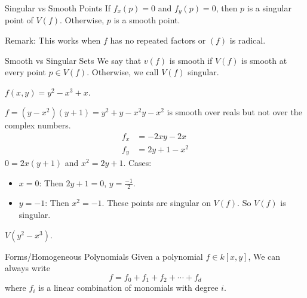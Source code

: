 \documentclass{report}
\begin{document}
\begin{definition}{Singular vs Smooth Points}
    If $f_{x}(p) = 0$ and $f_{y}(p) = 0$, then $p$ is a singular point of $V(f)$. Otherwise, $p$ is a smooth point.
\end{definition}

Remark: This works when $f$ has no repeated factors or $(f)$ is radical.

\begin{definition}{Smooth vs Singular Sets}
    We say that $v(f)$ is smooth if $V(f)$ is smooth at every point $p \in V(f)$. Otherwise, we call $V(f)$ singular.
\end{definition}

\begin{examples}
    \begin{example}
        $f(x, y) = y^{2} - x^{3} + x$.
    \end{example}
    \begin{example}
        $f = (y - x^{2})(y + 1) = y^{2} + y - x^{2}y - x^{2}$ is smooth over reals but not over the complex numbers. 
            \begin{align*}
                f_{x} &= -2xy - 2x      \\
                f_{y} &= 2y + 1 - x^{2}   
            \end{align*}
        $0 = 2x(y + 1)$ and $x^{2} = 2y + 1$. Cases:
            \begin{itemize}
                \item $x = 0$: Then $2y + 1 = 0$, $y = \frac{-1}{2}$.

                \item $y = -1$: Then $x^{2} = -1$. These points are singular on $V(f)$. So $V(f)$ is singular.
            \end{itemize}
    \end{example}
    \begin{example}
        $V(y^{2} - x^{3})$.
    \end{example}
\end{examples}

\begin{definition}{Forms/Homogeneous Polynomials}
    Given a polynomial $f \in k[x, y]$, We can always write
        \begin{equation*}
            f = f_{0} + f_{1} + f_{2} + \cdots + f_{d}
        \end{equation*}
    where $f_{i}$ is a linear combination of monomials with degree $i$.
\end{definition}
\end{document}
